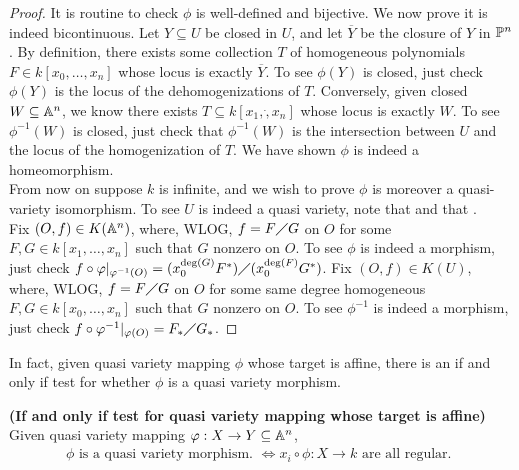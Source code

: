 \documentclass{report}
\begin{document}
\begin{proof}
It is routine to check $\phi$ is well-defined and bijective. We now prove it is indeed bicontinuous. Let $Y\subseteq U$ be closed in $U$, and let $\overline{Y}$ be the closure of $Y$ in $\P^n$. By definition, there exists some collection  $T$ of homogeneous polynomials $F \in k[x_0,\dots ,x_n]$ whose locus is exactly $\overline{Y}$. To see $\phi (Y)$ is closed, just check $\phi (Y)$ is the locus of the dehomogenizations of $T$. Conversely, given closed $W \subseteq \A^n$, we know there exists $T\subseteq k[x_1,\dot ,x_n]$ whose  locus is exactly $W$. To see $\phi ^{-1}(W)$ is closed, just check that $\phi^{-1}(W)$ is the intersection between $U$ and the locus of the homogenization of $T$. We have shown $\phi$ is indeed a homeomorphism.\\

From now on suppose $k$ is infinite, and we wish to prove $\phi$ is moreover a quasi-variety isomorphism. To see $U$ is indeed a quasi variety, note that   and that .\\

Fix $(O,f) \in K(\A^n)$, where, WLOG, $f=F\quotient G$ on $O$ for some  $F,G \in k[x_1,\dots ,x_n]$ such that $G$ nonzero on  $O$. To see $\phi$ is indeed a morphism, just check $f \circ \phi|_{\phi^{-1}(O)}=(x_0^{\operatorname{deg}(G)}F^*)\quotient (x_0^{\operatorname{deg}(F)}G^*)$. Fix $(O,f) \in K(U)$, where, WLOG, $f=F\quotient G$ on $O$ for some same degree homogeneous $F,G \in k[x_0,\dots ,x_n]$ such that $G$ nonzero on $O$. To see $\phi^{-1}$ is indeed a morphism, just check $f \circ \phi^{-1}|_{\phi (O)}=F_*\quotient G_*$. 
\end{proof}
In fact, given quasi variety mapping $\phi$ whose target is affine, there is an if and only if test  for whether $\phi$ is a quasi variety morphism. 
\begin{theorem}
\label{Iaoi}
\textbf{(If and only if test for quasi variety mapping whose target is affine)} Given quasi variety mapping $\phi :X\rightarrow Y \subseteq \A^n$, 
\begin{align*}
\phi \text{ is a quasi variety morphism. }\iff  x_i\circ \phi:X\rightarrow k\text{ are all regular. }
\end{align*}
\end{theorem}
\end{document}
